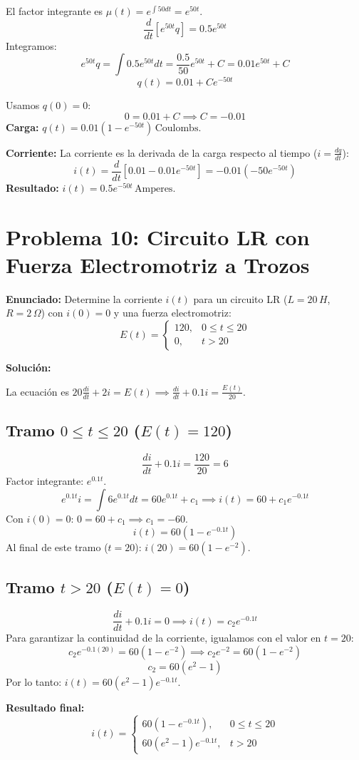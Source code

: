 \documentclass[a4paper]{article}
\begin{document}
El factor integrante es $\mu(t) = e^{\int 50 dt} = e^{50t}$.
$$\frac{d}{dt} [e^{50t} q] = 0.5 e^{50t}$$
Integramos:
$$e^{50t} q = \int 0.5 e^{50t} dt = \frac{0.5}{50} e^{50t} + C = 0.01 e^{50t} + C$$
$$q(t) = 0.01 + C e^{-50t}$$

Usamos $q(0) = 0$:
$$0 = 0.01 + C \implies C = -0.01$$
\textbf{Carga:} $q(t) = 0.01 (1 - e^{-50t}) \, \text{Coulombs}$.

\textbf{Corriente:}
La corriente es la derivada de la carga respecto al tiempo ($i = \frac{dq}{dt}$):
$$i(t) = \frac{d}{dt} [0.01 - 0.01 e^{-50t}] = -0.01 (-50 e^{-50t})$$
\textbf{Resultado:} $i(t) = 0.5 e^{-50t} \, \text{Amperes}$.

\section{Problema 10: Circuito LR con Fuerza Electromotriz a Trozos}

\textbf{Enunciado:} Determine la corriente $i(t)$ para un circuito LR ($L = 20 \, H$, $R = 2 \, \Omega$) con $i(0) = 0$ y una fuerza electromotriz:
$$E(t) = \begin{cases} 120, & 0 \le t \le 20 \\ 0, & t > 20 \end{cases}$$

\textbf{Solución:}

La ecuación es $20 \frac{di}{dt} + 2i = E(t) \implies \frac{di}{dt} + 0.1i = \frac{E(t)}{20}$.

\subsection*{Tramo $0 \le t \le 20$ ($E(t) = 120$)}
$$\frac{di}{dt} + 0.1i = \frac{120}{20} = 6$$
Factor integrante: $e^{0.1t}$.
$$e^{0.1t} i = \int 6 e^{0.1t} dt = 60 e^{0.1t} + c_1 \implies i(t) = 60 + c_1 e^{-0.1t}$$
Con $i(0) = 0$: $0 = 60 + c_1 \implies c_1 = -60$.
$$i(t) = 60 (1 - e^{-0.1t})$$
Al final de este tramo ($t = 20$): $i(20) = 60 (1 - e^{-2})$.

\subsection*{Tramo $t > 20$ ($E(t) = 0$)}
$$\frac{di}{dt} + 0.1i = 0 \implies i(t) = c_2 e^{-0.1t}$$
Para garantizar la continuidad de la corriente, igualamos con el valor en $t=20$:
$$c_2 e^{-0.1(20)} = 60 (1 - e^{-2}) \implies c_2 e^{-2} = 60 (1 - e^{-2})$$
$$c_2 = 60 (e^{2} - 1)$$
Por lo tanto: $i(t) = 60 (e^{2} - 1) e^{-0.1t}$.

\textbf{Resultado final:}
$$i(t) = \begin{cases} 60 (1 - e^{-0.1t}), & 0 \le t \le 20 \\ 60 (e^2 - 1) e^{-0.1t}, & t > 20 \end{cases}$$



 
\end{document}
